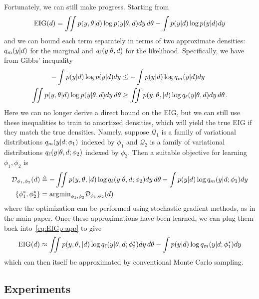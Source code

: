 Fortunately, we can still make progress. Starting from
\begin{equation}
\label{eq:EIGp-app}
	\text{EIG}(d) = \iint  p(y, \theta | d) \log p(y|\theta, d) dy\,d\theta - \int p(y | d) \log p(y | d) dy
\end{equation}
and we can bound each term separately in terms of two approximate densities: $q_m(y|d)$ for the marginal and $q_\ell(y|\theta,d)$ for the likelihood. Specifically,
we have from Gibbs' inequality
\begin{align}
	-\int p(y | d) \log p(y | d) dy &\le -\int  p(y|d)\log q_m(y|d) dy \\
	\iint p(y, \theta |d) \log p(y|\theta,d) dy\,d\theta & \ge \iint p(y, \theta, | d) \log q_\ell(y|\theta, d) dy\,d\theta \,.
\end{align}
Here we can no longer derive a direct bound on the EIG, but we can still
use these inequalities to train to amortized densities, which will yield the
true EIG if they match the true densities.
Namely, suppose $\mathcal{Q}_1$ is a family of variational distributions  $q_m(y|d; \phi_1)$ indexed by $\phi_1$ 
and $\mathcal{Q}_2$ is a family of variational distributions $q_\ell(y|\theta,d; \phi_2)$ indexed by $\phi_2$. Then a suitable objective for learning $\phi_1, \phi_2$ is
\begin{align}
\mathcal{D}_{\phi_1, \phi_2}(d) &\triangleq
- \iint  p(y, \theta, | d) \log q_\ell(y|\theta, d; \phi_2)dy\,d\theta 
-\int p(y | d) \log q_m(y | d; \phi_1)dy  \\
\{\phi_1^*, \phi_2^*\}	&= \text{argmin}_{\phi_1, \phi_2} \mathcal{D}_{\phi_1, \phi_2}(d)
	\end{align}
where the optimization can be performed using stochastic gradient methods, as in the main paper. Once these approximations have been learned, we can plug
them back into~\eqref{eq:EIGp-app} to give
\begin{equation}
	 \text{EIG}(d) \approx  \iint  p(y, \theta, | d)\log q_\ell(y|\theta, d; \phi_2^*) dy\,d\theta 
	 -\int p(y | d) \log q_m(y | d; \phi_1^*) dy
\end{equation}
which can then itself be approximated by conventional Monte Carlo
sampling.

\subsection{Experiments}
\label{sec:experiments}

